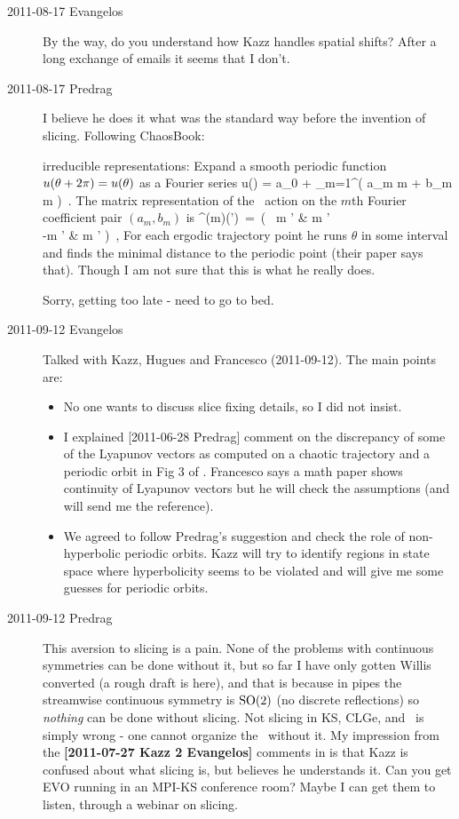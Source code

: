 \begin{description}
\item[2011-08-17 Evangelos]
By the way, do you understand how Kazz handles spatial shifts? After a
long exchange of emails it seems that I don't.

\item[2011-08-17 Predrag]
I believe he does it what was the standard way before the invention of
slicing. Following ChaosBook:

{ irreducible representations:}
Expand a smooth periodic function $u({\bf \theta} + 2\pi) =
u({\bf \theta})$ as a Fourier series
\beq
u(\gSpace) = a_0 + \sum_{m=1}^\infty \left(
a_m \cos m \gSpace + b_m \sin m \gSpace
                               \right)
\,.
The matrix representation of the \ action
on the $m$th Fourier coefficient pair
$(a_m,b_m)$ is
\beq
\LieEl^{(m)}(\gSpace') \,=\,  \left(
 ~\cos m \gSpace'  & \sin m \gSpace' \\
 -\sin m \gSpace'  & \cos m \gSpace'
    \earr\right)
\,,
For each ergodic trajectory point he runs $\theta$ in some interval and
finds the minimal distance to the periodic point (their paper says that).
Though I am not sure that this is what he really does.

Sorry, getting too late - need to go to bed.

\item[2011-09-12 Evangelos] Talked with Kazz, Hugues and Francesco (2011-09-12).
The main points are:
\begin{itemize}
 \item No one wants to discuss slice fixing details, so I did not insist.
 \item I explained [2011-06-28 Predrag] comment on the discrepancy of some of the
	Lyapunov vectors as computed on a chaotic trajectory and a periodic
	orbit in Fig 3 of . Francesco says a math paper shows
	continuity of Lyapunov vectors but he will check the assumptions
	(and will send me the reference).
 \item We agreed to follow Predrag's suggestion and check the
	role of non-hyper\-bolic periodic orbits. Kazz will try to identify
	regions in state space where hyper\-bolicity seems to
	be violated and will give me some guesses for periodic orbits.
\end{itemize}

\item[2011-09-12 Predrag] This aversion to slicing is a pain. None of the
problems with continuous symmetries can be done without it, but so far I
have only gotten Willis converted
{(a rough draft is here)}, and that is because in pipes the streamwise
continuous symmetry is $\textrm{SO}(2)$ (no discrete reflections) so
\emph{nothing} can be done without slicing. Not slicing in KS, CLGe, and
\pCf\ is simply wrong - one cannot organize the \statesp\ without it. My
impression from the {\bf [2011-07-27 Kazz 2 Evangelos]} comments in
 is that Kazz is confused about what slicing
is, but believes he understands it. Can you get EVO running in an MPI-KS
conference room? Maybe I can get them to listen, through a webinar on
slicing.


\end{description}
